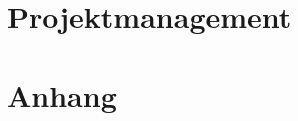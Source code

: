 \documentclass[11pt, a4paper, oneside, titlepage]{memoir}
\begin{document}
\part{Projektmanagement}

 
\part*{Anhang}
\appendix
\frontmatter






\cleardoublepage
\renewcommand{\listfigurename}{Anhang C: Abbildungsverzeichnis}
\listoffigures

\cleardoublepage
\renewcommand{\listtablename}{Anhang D: Tabellenverzeichnis}
\listoftables








\backmatter
\end{document}
